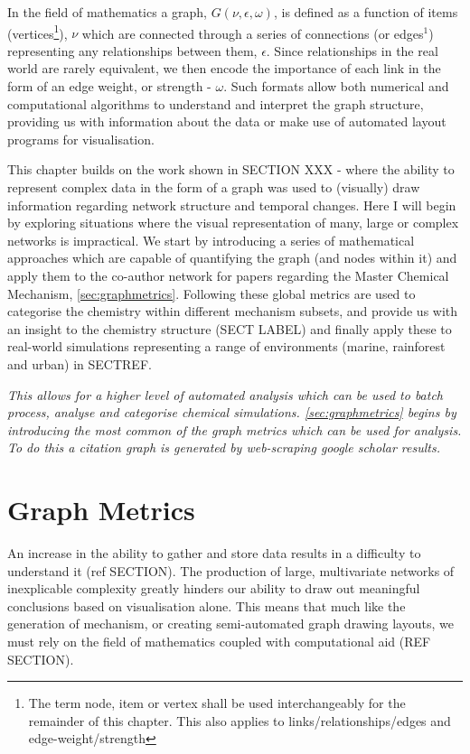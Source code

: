 In the field of mathematics a graph, $G(\nu,\epsilon,\omega)$, is defined as a function of items (vertices\footnote{The term node, item or vertex shall be used interchangeably for the remainder of this chapter. This also applies to links/relationships/edges and edge-weight/strength}), $\nu$ which are connected through a series of connections (or edges$^1$) representing any relationships between them, $\epsilon$. Since relationships in the real world are rarely equivalent, we then encode the importance of each link in the form of an edge weight, or strength - $\omega$. Such formats allow both numerical and computational algorithms to understand and interpret the graph structure, providing us with information about the data or make use of automated layout programs for visualisation. 


This chapter builds on the work shown in SECTION XXX - where 
the ability to represent complex data in the form of a graph was used to (visually) draw information regarding network structure and temporal changes. Here I will begin by exploring situations where the visual representation of many, large or complex networks is impractical. We start by introducing a series of mathematical approaches which are capable of quantifying the graph (and nodes within it) and apply them to the co-author network for papers regarding the Master Chemical Mechanism, \autoref{sec:graphmetrics}. Following these global metrics are used to categorise the chemistry within different mechanism subsets, and provide us with an insight to the chemistry structure (SECT LABEL) and finally apply these to real-world simulations representing a range of environments (marine, rainforest and urban) in SECTREF.


\textit{
This allows for a higher level of automated analysis which can be used to batch process, analyse and categorise chemical simulations. \autoref{sec:graphmetrics} begins by introducing the most common of the graph metrics which can be used for analysis. To do this a citation graph is generated by web-scraping google scholar results. 
}


\section{Graph Metrics}\label{sec:graphmetrics}

An increase in the ability to gather and store data results in a difficulty to understand it (ref SECTION). The production of large, multivariate networks of inexplicable complexity greatly hinders our ability to draw out meaningful conclusions based on visualisation alone. This means that much like the generation of mechanism, or creating semi-automated graph drawing layouts, we must rely on the field of mathematics coupled with computational aid (REF SECTION).

